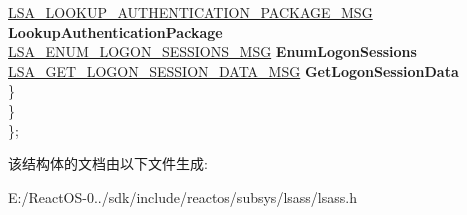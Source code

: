 \begin{DoxyCompactItemize}
\begin{tabbing}
\>\>\>\hyperlink{struct___l_s_a___l_o_o_k_u_p___a_u_t_h_e_n_t_i_c_a_t_i_o_n___p_a_c_k_a_g_e___m_s_g}{LSA\_LOOKUP\_AUTHENTICATION\_PACKAGE\_MSG} {\bfseries LookupAuthenticationPackage}\\
\>\>\>\hyperlink{struct___l_s_a___e_n_u_m___l_o_g_o_n___s_e_s_s_i_o_n_s___m_s_g}{LSA\_ENUM\_LOGON\_SESSIONS\_MSG} {\bfseries EnumLogonSessions}\\
\>\>\>\hyperlink{struct___l_s_a___g_e_t___l_o_g_o_n___s_e_s_s_i_o_n___d_a_t_a___m_s_g}{LSA\_GET\_LOGON\_SESSION\_DATA\_MSG} {\bfseries GetLogonSessionData}\\
\>\>\} \\
\>\} \\
\}; \\

\end{tabbing}\end{DoxyCompactItemize}


该结构体的文档由以下文件生成\+:\begin{DoxyCompactItemize}
\item 
E\+:/\+React\+O\+S-\/0../sdk/include/reactos/subsys/lsass/lsass.\+h\end{DoxyCompactItemize}
